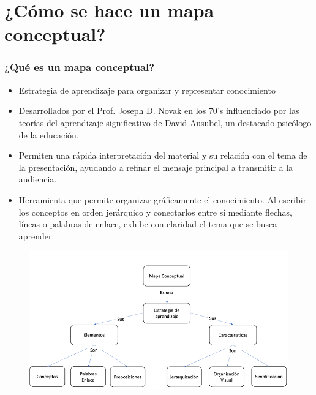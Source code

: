 \documentclass[
	11pt, %
]{beamer}
\begin{document}
\section{¿Cómo se hace un mapa conceptual?}
\begin{frame}
  \frametitle{¿Qué es un mapa conceptual?}

  \begin{itemize}
    \item Estrategia de aprendizaje para organizar y representar conocimiento
    \item Desarrollados por el Prof. Joseph D. Novak en los 70's influenciado por las teorías del aprendizaje significativo de David Ausubel, un destacado psicólogo de la educación.
    
    \item Permiten una rápida interpretación del material y su relación con el tema de la presentación, ayudando a refinar el mensaje principal a transmitir a la audiencia.
      
    \item Herramienta que permite organizar gráficamente el conocimiento. Al escribir los conceptos en orden jerárquico y conectarlos entre sí mediante flechas, líneas o palabras de enlace, exhibe con claridad el tema que se busca aprender. 
      
  \end{itemize}

\end{frame}

\begin{frame}
  
  \begin{figure}
    \includegraphics[width=0.7\linewidth]{mapa_conceptual.png}
  \end{figure}

\end{frame}
\end{document}
